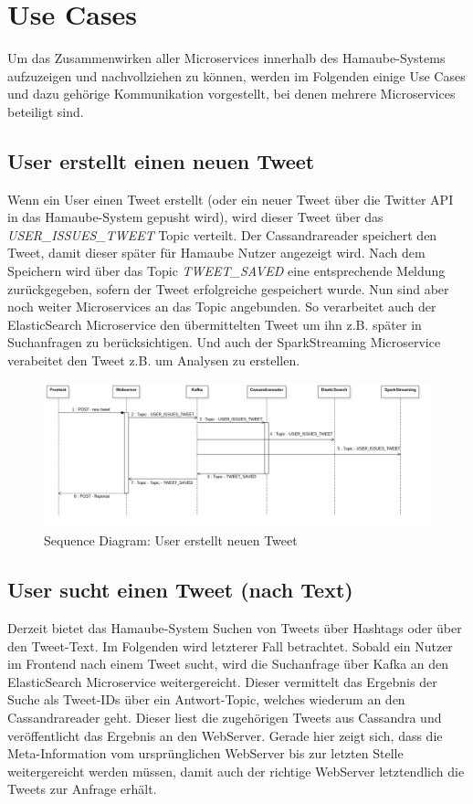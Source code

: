 \chapter{Use Cases}
\label{Use Cases}
Um das Zusammenwirken aller Microservices innerhalb des Hamaube-Systems aufzuzeigen und nachvollziehen zu können, werden im Folgenden einige Use Cases und dazu gehörige Kommunikation vorgestellt, bei denen mehrere Microservices beteiligt sind.

\section{User erstellt einen neuen Tweet}
Wenn ein User einen Tweet erstellt (oder ein neuer Tweet über die Twitter API in das Hamaube-System gepusht wird),
wird dieser Tweet über das \textit{USER\_ISSUES\_TWEET} Topic verteilt.
Der Cassandrareader speichert den Tweet, damit dieser später für Hamaube Nutzer angezeigt wird. Nach dem Speichern wird über das Topic \textit{TWEET\_SAVED} eine entsprechende Meldung zurückgegeben, sofern der Tweet erfolgreiche gespeichert wurde.
Nun sind aber noch weiter Microservices an das Topic angebunden. So verarbeitet auch der ElasticSearch Microservice den übermittelten Tweet um ihn z.B. später in Suchanfragen zu berücksichtigen. Und auch der SparkStreaming Microservice verabeitet den Tweet z.B. um Analysen zu erstellen.

\begin{figure}[H]
	\includegraphics[width=\textwidth]{pics/useCases/IssueTweet}
	\caption{Sequence Diagram: User erstellt neuen Tweet}
\end{figure}

\section{User sucht einen Tweet (nach Text)}
Derzeit bietet das Hamaube-System Suchen von Tweets über Hashtags oder über den Tweet-Text.
Im Folgenden wird letzterer Fall betrachtet.
Sobald ein Nutzer im Frontend nach einem Tweet sucht, wird die Suchanfrage über Kafka an den ElasticSearch Microservice weitergereicht. Dieser vermittelt das Ergebnis der Suche als Tweet-IDs über ein Antwort-Topic, welches wiederum an den Cassandrareader geht.
Dieser liest die zugehörigen Tweets aus Cassandra und veröffentlicht das Ergebnis an den WebServer.
Gerade hier zeigt sich, dass die Meta-Information vom ursprünglichen WebServer bis zur letzten Stelle weitergereicht werden müssen, damit auch der richtige WebServer letztendlich die Tweets zur Anfrage erhält.


